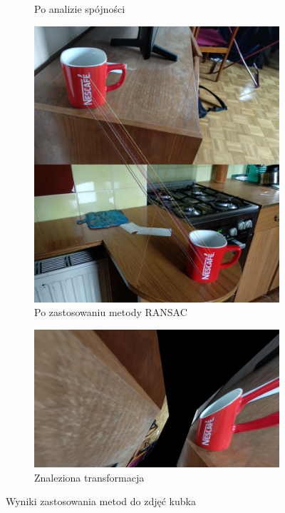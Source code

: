 \documentclass{article}
\begin{document}
\begin{figure}[H]
\begin{subfigure}[b]{0.4\linewidth}
			\caption{Po analizie spójności}
		\end{subfigure}
		\begin{subfigure}[b]{0.4\linewidth}
			\includegraphics[width=\linewidth]{kum.png}
			\caption{Po zastosowaniu metody RANSAC}
		\end{subfigure}
		\begin{subfigure}[b]{0.6\linewidth}
			\includegraphics[width=\linewidth]{kut.png}
			\caption{Znaleziona transformacja}
		\end{subfigure}
		\caption{Wyniki zastosowania metod do zdjęć kubka}
		\label{fig:w3}
	\end{figure}
\end{document}
